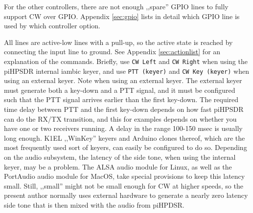 \documentclass[12pt]{book}
\def\bltt#1{\texttt{\color{blue}#1}}
\def\pH{pi\-HPSDR\xspace}
\begin{document}
For the other controllers, there are not enough ,,spare'' GPIO lines to fully
support CW over GPIO. Appendix \ref{sec:gpio} lists in detail which GPIO line
is used by which controller option.

All lines are active-low lines with a pull-up, so the active state is reached
by connecting the input line to ground. See Appendix \ref{sec:actionlist} for
an explanation of the commands. Briefly, use \bltt{CW Left} and \bltt{CW Right}
when using the \pH internal iambic keyer, and use \bltt{PTT (keyer)} and
\bltt{CW Key (keyer)} when using an external keyer. Note when using an external
keyer. The external keyer must generate both a key-down and a PTT signal, and it must be configured
such that the PTT signal arrives earlier than the first key-down. The required time
delay between PTT and the first key-down depends  on how fast \pH can do the
RX/TX transition, and this for examples depends on whether you have one or two receivers
running. A delay in the range 100-150 msec is usually long enough.
K1EL ,,WinKey'' keyers and Arduino clones thereof, which are the most frequently
used sort
of keyers, can easily be configured to do so. Depending on the audio subsystem,
the latency of the side tone, when using the internal keyer, may be a problem.
The ALSA audio module for Linux, as well as the PortAudio audio  module for MacOS,
 take special provisions to keep this latency small. Still, ,,small'' might not
 be small enough for CW at higher speeds, so the present author normally uses
 external hardware to generate a nearly zero latency side tone that is then
 mixed with the audio from piHPDSR.
\end{document}
